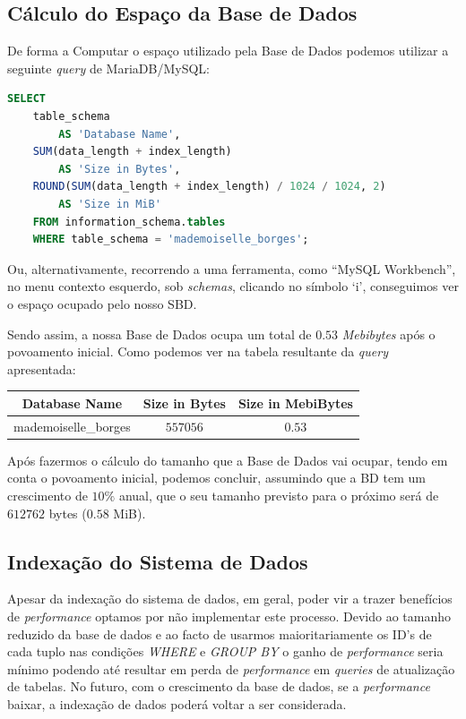 \documentclass[a4paper,12pt]{scrreprt}
\begin{document}
\subsection{Cálculo do Espaço da Base de Dados}
De forma a Computar o espaço utilizado pela Base de Dados podemos utilizar a seguinte \textit{query} de MariaDB/MySQL:
\begin{lstlisting}[language=sql]
SELECT 
    table_schema 
        AS 'Database Name', 
    SUM(data_length + index_length)
        AS 'Size in Bytes', 
    ROUND(SUM(data_length + index_length) / 1024 / 1024, 2) 
        AS 'Size in MiB' 
    FROM information_schema.tables
    WHERE table_schema = 'mademoiselle_borges';
\end{lstlisting}
Ou, alternativamente, recorrendo a uma ferramenta, como ``MySQL Workbench'', no menu contexto esquerdo, sob \textit{schemas}, clicando no símbolo
`i', conseguimos ver o espaço ocupado pelo nosso SBD.

Sendo assim, a nossa Base de Dados ocupa um total de $0.53$ \textit{Mebibytes} após o povoamento inicial.
Como podemos ver na tabela resultante da \textit{query} apresentada:\\
\begin{center}
\begin{tabular}{ |c | c | c |}
    \hline
     Database Name & Size in Bytes & Size in MebiBytes \\
     \hline
     mademoiselle\_borges & $557056$ &   $0.53$ \\ 
    \hline
\end{tabular}
\end{center}

Após fazermos o cálculo do tamanho que a Base de Dados vai ocupar, tendo em conta o povoamento inicial, podemos concluir, assumindo que a BD tem um crescimento de $10\%$ anual, que o seu tamanho previsto para o próximo será de $612762$ bytes ($0.58$ MiB).

\subsection{Indexação do Sistema de Dados}
Apesar da indexação do sistema de dados, em geral, poder vir a trazer benefícios de \textit{performance} optamos por não implementar este processo.
Devido ao tamanho reduzido da base de dados e ao facto de usarmos maioritariamente os ID's de cada tuplo nas condições 
\textit{WHERE} e \textit{GROUP BY} o ganho de \textit{performance} seria mínimo podendo até resultar em perda de \textit{performance} em \textit{queries} de atualização de tabelas. No futuro, com o crescimento da base de dados, se a 
\textit{performance} baixar, a indexação de dados poderá voltar a ser considerada.
\end{document}
